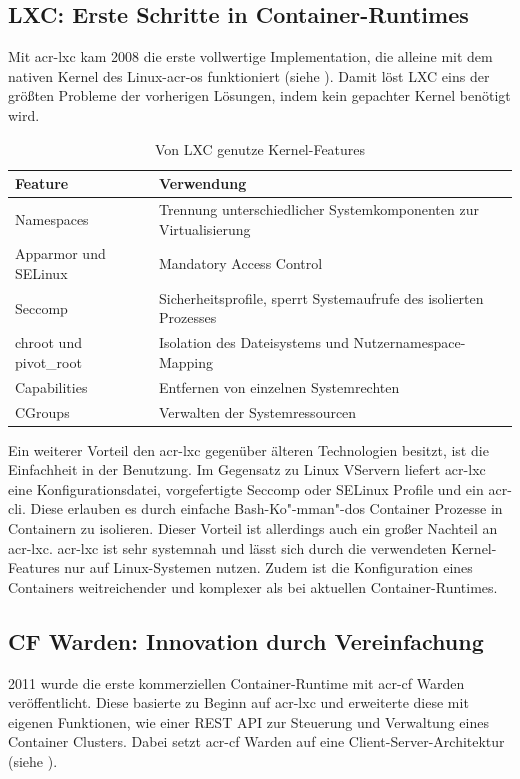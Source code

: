\subsection{LXC: Erste Schritte in Container-Runtimes}
\label{sec:geschichteLXC}
Mit \gls{acr-lxc} kam 2008 die erste vollwertige Implementation, die alleine mit dem nativen Kernel des Linux-\gls{acr-os} funktioniert (siehe ). Damit löst LXC eins der größten Probleme der vorherigen Lösungen, indem kein gepachter Kernel benötigt wird.

\begin{table}[h]
		\begin{tabu} to 
			\toprule
			Feature & Verwendung\\
			\midrule
			Namespaces & Trennung unterschiedlicher Systemkomponenten zur Virtualisierung\\
			Apparmor und SELinux & Mandatory Access Control\\
			Seccomp & Sicherheitsprofile, sperrt Systemaufrufe des isolierten Prozesses\\
			chroot und pivot\_root & Isolation des Dateisystems und Nutzernamespace-Mapping\\
			Capabilities & Entfernen von einzelnen Systemrechten\\
			CGroups & Verwalten der Systemressourcen\\
			\bottomrule
		\end{tabu}
	\caption{Von LXC genutze Kernel-Features \citep{Lxc7LinuxManualPage}}
	\label{tab:lxcKernel}
\end{table}

Ein weiterer Vorteil den \gls{acr-lxc} gegenüber älteren Technologien besitzt, ist die Einfachheit in der Benutzung. Im Gegensatz zu Linux VServern liefert \gls{acr-lxc} eine Konfigurationsdatei, vorgefertigte Seccomp oder SELinux Profile und ein \gls{acr-cli}. Diese erlauben es durch einfache Bash-Ko"-mman"-dos Container Prozesse in Containern zu isolieren. Dieser Vorteil ist allerdings auch ein großer Nachteil an \gls{acr-lxc}. \gls{acr-lxc} ist sehr systemnah und lässt sich durch die verwendeten Kernel-Features nur auf Linux-Systemen nutzen. Zudem ist die Konfiguration eines Containers weitreichender und komplexer als bei aktuellen Container-Runtimes.

\subsection{CF Warden: Innovation durch Vereinfachung}
\label{sec:geschichteCFWarden}
2011 wurde die erste kommerziellen Container-Runtime mit \gls{acr-cf} Warden veröffentlicht. Diese basierte zu Beginn auf \gls{acr-lxc} und erweiterte diese mit eigenen Funktionen, wie einer REST API zur Steuerung und Verwaltung eines Container Clusters. Dabei setzt \gls{acr-cf} Warden auf eine Client-Server-Architektur (siehe ). 


